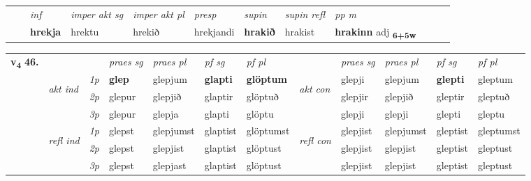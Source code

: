 \begin{tabular}{llllllllllll}
 & & \textit{inf} & \textit{imper akt sg} & \textit{imper akt pl}   & \textit{presp} & \textit{supin} & \textit{supin refl} & \textit{pp m}     \\*
  & & \textbf{hrekja} & hrektu  & hrekið   & hrekjandi &  \textbf{hrakið} & hrakist & \textbf{hrakinn} adj \textbf{\textsubscript{6+5w}} \\*
\cmidrule{1-12}
\end{tabular}



\begin{tabular}{llllllllllll} \toprule
\multirow{4}{*}{{{\textbf{v{\textsubscript{4}}} \Large{\textbf{46.}}}}}  & &   &  \textit{praes sg}  & \textit{praes pl}  &\textit{ pf sg} & \textit{pf pl} &  &  \textit{praes sg}  & \textit{praes pl}  & \textit{pf sg} & \textit{pf pl } \\*
	\cmidrule{4-7} \cmidrule{9-12}
 & \multirow{3}{*}{\begin{turn}{90}\textit{akt ind}\end{turn}} & {\textit{1p}} & \textbf{glep} & glepjum    & \textbf{glapti} & \textbf{glöptum} & \multirow{3}{*}{\begin{turn}{90}\textit{akt con}\end{turn}} &glepji & glepjum & \textbf{glepti} & gleptum\\*
& &  {\textit{2p}} &  glepur  & glepjið   & glaptir & glöptuð & & glepjir & glepjið & gleptir & gleptuð \\*
& &  {\textit{3p}} & glepur & glepja   & glapti & glöptu & & glepji & glepji& glepti & gleptu  \\*
\cmidrule{4-7} \cmidrule{9-12}
 &\multirow{3}{*}{\begin{turn}{90}\textit{refl ind}\end{turn}} & {\textit{1p}} & glepst & glepjumst    & glaptist & glöptumst & \multirow{3}{*}{\begin{turn}{90}\textit{refl con}\end{turn}}  &glepjist & glepjumst & gleptist & gleptumst\\*
 &&  {\textit{2p}} &  glepst  & glepjist   & glaptist & glöptust & &glepjist & glepjist & gleptist & gleptust \\*
& &  {\textit{3p}} & glepst & glepjast   & glaptist & glöptust & & glepjist & glepjist& gleptist & gleptust  \\*
\cmidrule{4-7} \cmidrule{9-12}
\end{tabular}


